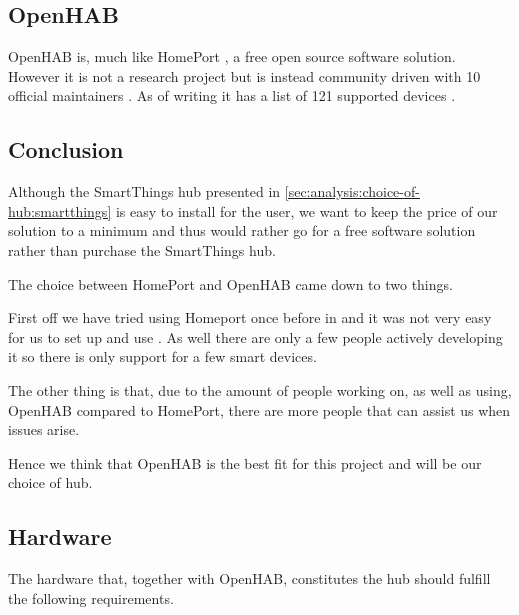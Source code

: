\subsection{OpenHAB}
\label{sec:analysis:choice-of-hub:openhab}

OpenHAB \cite{OPENHAB} is, much like HomePort , a free open source software solution.
However it is not a research project but is instead community driven with 10 official maintainers \cite{openhab:maintainers}.
As of writing it has a list of 121 supported devices \cite{openhab:supported-technologies}.


\subsection{Conclusion}
\label{sec:analysis:choice-of-hub:conclusion}

Although the SmartThings hub presented in \cref{sec:analysis:choice-of-hub:smartthings} is easy to install for the user, we want to keep the price of our solution to a minimum and thus would rather go for a free software solution rather than purchase the SmartThings hub.

The choice between HomePort and OpenHAB came down to two things.

First off we have tried using Homeport once before in \cite{previous-report} and it was not very easy for us to set up and use .
As well there are only a few people actively developing it so there is only support for a few smart devices.

The other thing is that, due to the amount of people working on, as well as using, OpenHAB compared to HomePort, there are more people that can assist us when issues arise.

Hence we think that OpenHAB is the best fit for this project and will be our choice of hub.

\subsection{Hardware}

The hardware that, together with OpenHAB, constitutes the hub should fulfill the following requirements.

